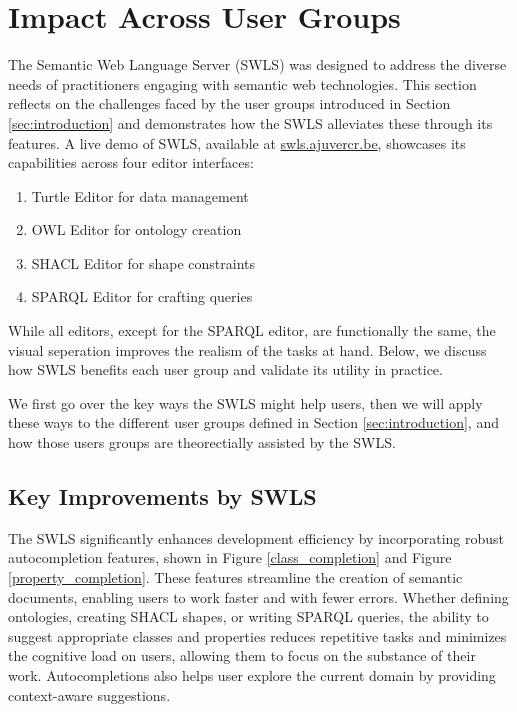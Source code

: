 \section{Impact Across User Groups}%
\label{sec:usage}

The Semantic Web Language Server (SWLS) was designed to address the diverse needs of practitioners engaging with semantic web technologies. This section reflects on the challenges faced by the user groups introduced in Section \ref{sec:introduction} and demonstrates how the SWLS alleviates these through its features. A live demo of SWLS, available at \url{swls.ajuvercr.be}, showcases its capabilities across four editor interfaces:

\begin{enumerate}
  \item Turtle Editor for data management
  \item OWL Editor for ontology creation
  \item SHACL Editor for shape constraints
  \item SPARQL Editor for crafting queries
\end{enumerate}

While all editors, except for the SPARQL editor, are functionally the same, 
the visual seperation improves the realism of the tasks at hand.
Below, we discuss how SWLS benefits each user group and validate its utility in practice.

We first go over the key ways the SWLS might help users, then we will apply these ways to the different user groups defined in Section \ref{sec:introduction}, 
and how those users groups are theorectially assisted by the SWLS.

\subsection{Key Improvements by SWLS}

The SWLS significantly enhances development efficiency by incorporating robust autocompletion features, shown in Figure \ref{class_completion} and Figure \ref{property_completion}.
These features streamline the creation of semantic documents, enabling users to work faster and with fewer errors. 
Whether defining ontologies, creating SHACL shapes, or writing SPARQL queries, the ability to suggest appropriate classes and properties reduces repetitive tasks and minimizes the cognitive load on users, allowing them to focus on the substance of their work.
Autocompletions also helps user explore the current domain by providing context-aware suggestions.

